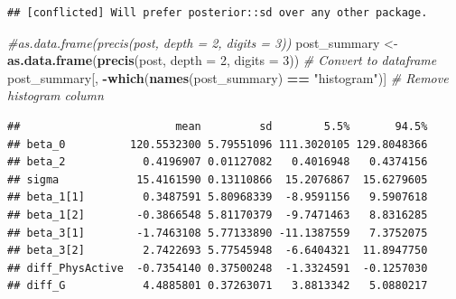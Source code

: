 \documentclass[
]{book}
\newenvironment{Shaded}{\begin{snugshade}}{\end{snugshade}}
\newcommand{\AttributeTok}[1]{\textcolor[rgb]{0.13,0.29,0.53}{#1}}
\newcommand{\CommentTok}[1]{\textcolor[rgb]{0.56,0.35,0.01}{\textit{#1}}}
\newcommand{\DecValTok}[1]{\textcolor[rgb]{0.00,0.00,0.81}{#1}}
\newcommand{\FunctionTok}[1]{\textcolor[rgb]{0.13,0.29,0.53}{\textbf{#1}}}
\newcommand{\NormalTok}[1]{#1}
\newcommand{\OtherTok}[1]{\textcolor[rgb]{0.56,0.35,0.01}{#1}}
\newcommand{\SpecialCharTok}[1]{\textcolor[rgb]{0.81,0.36,0.00}{\textbf{#1}}}
\newcommand{\StringTok}[1]{\textcolor[rgb]{0.31,0.60,0.02}{#1}}
\begin{document}
\begin{Shaded}
\end{Shaded}

\begin{verbatim}
## [conflicted] Will prefer posterior::sd over any other package.
\end{verbatim}

\begin{Shaded}
\begin{Highlighting}[]
\CommentTok{\#as.data.frame(precis(post, depth = 2, digits = 3))}
\NormalTok{post\_summary }\OtherTok{\textless{}{-}} \FunctionTok{as.data.frame}\NormalTok{(}\FunctionTok{precis}\NormalTok{(post, }\AttributeTok{depth =} \DecValTok{2}\NormalTok{, }\AttributeTok{digits =} \DecValTok{3}\NormalTok{))  }\CommentTok{\# Convert to dataframe}
\NormalTok{post\_summary[, }\SpecialCharTok{{-}}\FunctionTok{which}\NormalTok{(}\FunctionTok{names}\NormalTok{(post\_summary) }\SpecialCharTok{==} \StringTok{"histogram"}\NormalTok{)]  }\CommentTok{\# Remove histogram column}
\end{Highlighting}
\end{Shaded}

\begin{verbatim}
##                        mean         sd        5.5%       94.5%
## beta_0          120.5532300 5.79551096 111.3020105 129.8048366
## beta_2            0.4196907 0.01127082   0.4016948   0.4374156
## sigma            15.4161590 0.13110866  15.2076867  15.6279605
## beta_1[1]         0.3487591 5.80968339  -8.9591156   9.5907618
## beta_1[2]        -0.3866548 5.81170379  -9.7471463   8.8316285
## beta_3[1]        -1.7463108 5.77133890 -11.1387559   7.3752075
## beta_3[2]         2.7422693 5.77545948  -6.6404321  11.8947750
## diff_PhysActive  -0.7354140 0.37500248  -1.3324591  -0.1257030
## diff_G            4.4885801 0.37263071   3.8813342   5.0880217
\end{verbatim}
\end{document}
